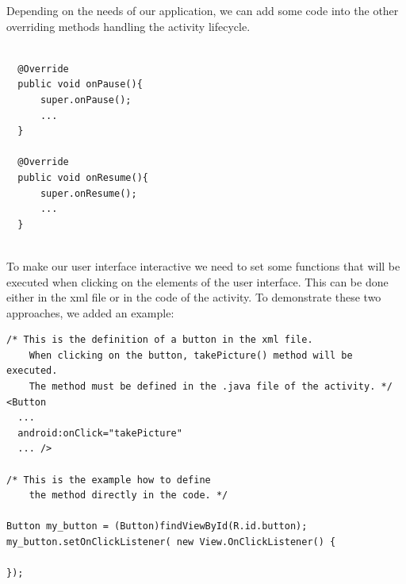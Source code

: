 Depending on the needs of our application, we can add some code into the other overriding methods handling the activity lifecycle.

\begin{lstlisting}
  
  @Override
  public void onPause(){
      super.onPause();
      ...
  }
	
  @Override
  public void onResume(){
      super.onResume();
      ...
  }
      
\end{lstlisting}

To make our user interface interactive we need to set some functions that will be executed when clicking on the elements of the user interface.
This can be done either in the xml file or in the code of the activity.
To demonstrate these two approaches, we added an example:

\begin{lstlisting}
/* This is the definition of a button in the xml file. 
    When clicking on the button, takePicture() method will be executed.
    The method must be defined in the .java file of the activity. */
<Button  
  ...
  android:onClick="takePicture"
  ... />
  
/* This is the example how to define 
    the method directly in the code. */

Button my_button = (Button)findViewById(R.id.button);
my_button.setOnClickListener( new View.OnClickListener() {
    
});
  
 
  
\end{lstlisting}









